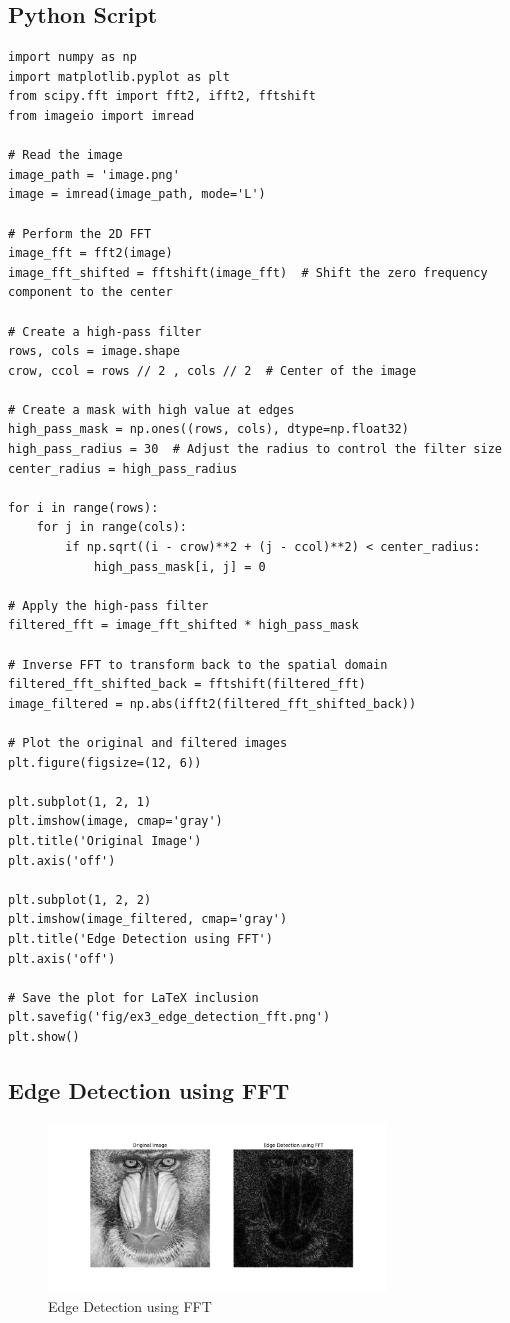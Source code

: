 \subsection*{Python Script}
\begin{verbatim}
import numpy as np
import matplotlib.pyplot as plt
from scipy.fft import fft2, ifft2, fftshift
from imageio import imread

# Read the image
image_path = 'image.png'
image = imread(image_path, mode='L')

# Perform the 2D FFT
image_fft = fft2(image)
image_fft_shifted = fftshift(image_fft)  # Shift the zero frequency component to the center

# Create a high-pass filter
rows, cols = image.shape
crow, ccol = rows // 2 , cols // 2  # Center of the image

# Create a mask with high value at edges
high_pass_mask = np.ones((rows, cols), dtype=np.float32)
high_pass_radius = 30  # Adjust the radius to control the filter size
center_radius = high_pass_radius

for i in range(rows):
    for j in range(cols):
        if np.sqrt((i - crow)**2 + (j - ccol)**2) < center_radius:
            high_pass_mask[i, j] = 0

# Apply the high-pass filter
filtered_fft = image_fft_shifted * high_pass_mask

# Inverse FFT to transform back to the spatial domain
filtered_fft_shifted_back = fftshift(filtered_fft)
image_filtered = np.abs(ifft2(filtered_fft_shifted_back))

# Plot the original and filtered images
plt.figure(figsize=(12, 6))

plt.subplot(1, 2, 1)
plt.imshow(image, cmap='gray')
plt.title('Original Image')
plt.axis('off')

plt.subplot(1, 2, 2)
plt.imshow(image_filtered, cmap='gray')
plt.title('Edge Detection using FFT')
plt.axis('off')

# Save the plot for LaTeX inclusion
plt.savefig('fig/ex3_edge_detection_fft.png')
plt.show()
\end{verbatim}

\subsection*{Edge Detection using FFT}
\begin{figure}[h]
    \centering
    \includegraphics[width=0.8\textwidth]{fig/ex3_edge_detection_fft.png}
    \caption{Edge Detection using FFT}
    \label{fig:ex3_edge_detection_fft}
\end{figure}

